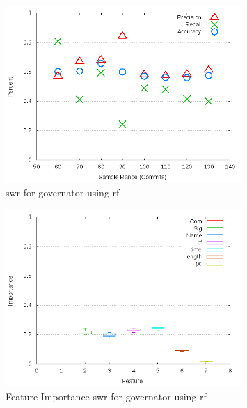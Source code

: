 \begin{figure}[!t]
\centering
\includegraphics[width=0.8\textwidth]{images/rf/test_1/governator_sample_range.png}
\caption{\gls{swr} for governator using \gls{rf}}
\label{fig:test_1_governator_rf}
\end{figure}

\begin{figure}[!t]
\centering
\includegraphics[width=0.8\textwidth]{images/rf/test_1/governator_importance.png}
\caption{Feature Importance \gls{swr} for governator using \gls{rf}}
\label{fig:test_1_governator_rf_importance}
\end{figure}

